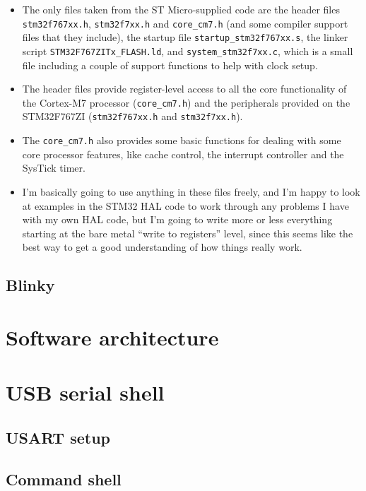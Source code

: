 \documentclass[a4paper,11pt]{article}
\begin{document}
\begin{itemize}
  \item{The only files taken from the ST Micro-supplied code are the
    header files \texttt{stm32f767xx.h}, \texttt{stm32f7xx.h} and
    \texttt{core\_cm7.h} (and some compiler support files that they
    include), the startup file \texttt{startup\_stm32f767xx.s}, the
    linker script \texttt{STM32F767ZITx\_FLASH.ld}, and
    \texttt{system\_stm32f7xx.c}, which is a small file including a
    couple of support functions to help with clock setup.}
  \item{The header files provide register-level access to all the core
    functionality of the Cortex-M7 processor (\texttt{core\_cm7.h})
    and the peripherals provided on the STM32F767ZI
    (\texttt{stm32f767xx.h} and \texttt{stm32f7xx.h}).}
  \item{The \texttt{core\_cm7.h} also provides some basic functions
    for dealing with some core processor features, like cache control,
    the interrupt controller and the SysTick timer.}
  \item{I'm basically going to use anything in these files freely, and
    I'm happy to look at examples in the STM32 HAL code to work
    through any problems I have with my own HAL code, but I'm going to
    write more or less everything starting at the bare metal ``write
    to registers'' level, since this seems like the best way to get a
    good understanding of how things really work.}
\end{itemize}

\subsection{Blinky}


\section{Software architecture}


\section{USB serial shell}

\subsection{USART setup}


\subsection{Command shell}
\end{document}
